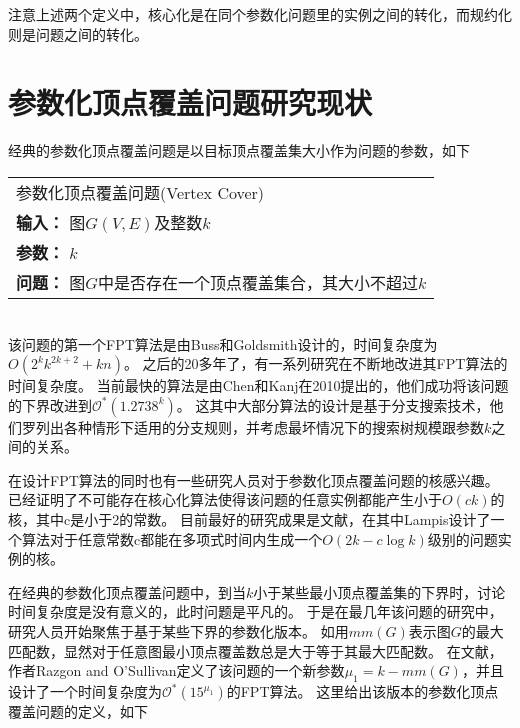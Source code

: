 注意上述两个定义中，核心化是在同个参数化问题里的实例之间的转化，而规约化则是问题之间的转化。

\section{参数化顶点覆盖问题研究现状}
经典的参数化顶点覆盖问题是以目标顶点覆盖集大小作为问题的参数，如下 \\

\begin{tabular}{| p{0.9\headwidth} |}
  \hline
  参数化顶点覆盖问题(Vertex Cover) \\
  \textbf{输入：} 图$G(V, E)$及整数$k$ \\
  \textbf{参数：} $k$\\
  \textbf{问题：} 图$G$中是否存在一个顶点覆盖集合，其大小不超过$k$\\
  \hline
\end{tabular} \vspace{0.5cm} \\

该问题的第一个FPT算法是由Buss和Goldsmith设计的，时间复杂度为$O(2^kk^{2k+2} + kn)$。
之后的20多年了，有一系列研究在不断地改进其FPT算法的时间复杂度。
当前最快的算法是由Chen和Kanj在2010提出的，他们成功将该问题的下界改进到$\mathcal{O}^*(1.2738^k)$。
这其中大部分算法的设计是基于分支搜索技术，他们罗列出各种情形下适用的分支规则，并考虑最坏情况下的搜索树规模跟参数$k$之间的关系。

在设计FPT算法的同时也有一些研究人员对于参数化顶点覆盖问题的核感兴趣。
已经证明了不可能存在核心化算法使得该问题的任意实例都能产生小于$O(ck)$的核，其中c是小于2的常数。
目前最好的研究成果是文献\cite{lampis2011kernel}，在其中Lampis设计了一个算法对于任意常数c都能在多项式时间内生成一个$O(2k - c \log k)$级别的问题实例的核。

在经典的参数化顶点覆盖问题中，到当$k$小于某些最小顶点覆盖集的下界时，讨论时间复杂度是没有意义的，此时问题是平凡的。
于是在最几年该问题的研究中，研究人员开始聚焦于基于某些下界的参数化版本。
如用$mm(G)$表示图$G$的最大匹配数，显然对于任意图最小顶点覆盖数总是大于等于其最大匹配数。
在文献\cite{razgon2009almost}，作者Razgon and O'Sullivan定义了该问题的一个新参数$\mu_1 = k - mm(G)$，并且设计了一个时间复杂度为$\mathcal{O}^*(15^{\mu_1})$的FPT算法。
这里给出该版本的参数化顶点覆盖问题的定义，如下\\

